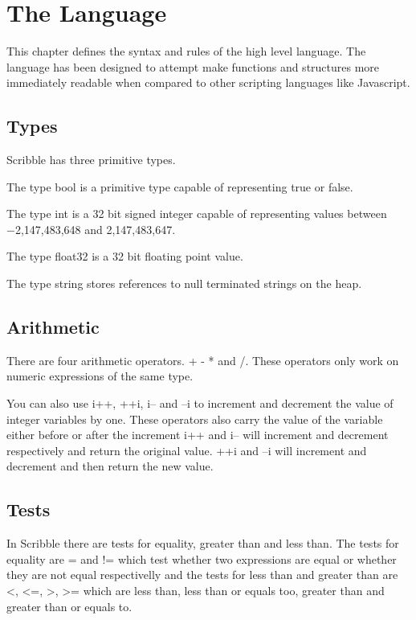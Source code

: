 \documentclass[]{final_report}
\begin{document}
\chapter{The Language}

This chapter defines the syntax and rules of the high level language. The language has been designed to attempt make functions and structures more immediately readable when compared to other scripting languages like Javascript.

\section{Types}

Scribble has three primitive types.

The type bool is a primitive type capable of representing true or false.

The type int is a 32 bit signed integer capable of representing values between  −2,147,483,648 and 2,147,483,647.

The type float32 is a 32 bit floating point value.

The type string stores references to null terminated strings on the heap.

\section{Arithmetic}

There are four arithmetic operators. + - * and /. These operators only work on numeric expressions of the same type.

You can also use i++, ++i, i-- and --i to increment and decrement the value of integer variables by one. These operators also carry the value of the variable either before or after the increment i++ and i-- will increment and decrement respectively and return the original value. ++i and --i will increment and decrement and then return the new value.

\section{Tests}

In Scribble there are tests for equality, greater than and less than. The tests for equality are = and != which test whether two expressions are equal or whether they are not equal respectivelly and the tests for less than and greater than are \textless, \textless=, \textgreater, \textgreater= which are less than, less than or equals too, greater than and greater than or equals to.
\end{document}
